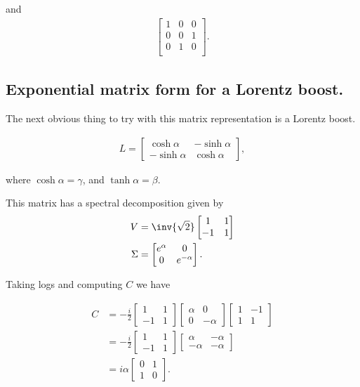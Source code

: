and
\begin{align*}
\begin{bmatrix}
1 & 0 & 0 \\
0 & 0 & 1 \\
0 & 1 & 0 \\
\end{bmatrix}.
\end{align*}

\subsection{Exponential matrix form for a Lorentz boost.}

The next obvious thing to try with this matrix representation is a Lorentz boost.

\begin{align}\label{eqn:rotationUnitary:40}
L =
\begin{bmatrix}
\cosh\alpha & -\sinh\alpha \\
-\sinh\alpha & \cosh\alpha
\end{bmatrix},
\end{align}

where $\cosh\alpha = \gamma$, and $\tanh\alpha = \beta$.

This matrix has a spectral decomposition given by
\begin{align}\label{eqn:rotationUnitary:41}
V &= \inv{\sqrt{2}}
\begin{bmatrix}
1 & 1 \\
-1 & 1
\end{bmatrix} \\
\Sigma &=
\begin{bmatrix}
e^\alpha & 0 \\
0 & e^{-\alpha}
\end{bmatrix}.
\end{align}

Taking logs and computing $C$ we have

\begin{align*}
C
&=
-\frac{i}{2}
\begin{bmatrix}
1 & 1 \\
-1 & 1
\end{bmatrix}
\begin{bmatrix}
\alpha & 0 \\
0 & -\alpha
\end{bmatrix}
\begin{bmatrix}
1 & -1 \\
1 & 1
\end{bmatrix} \\
&=
-\frac{i}{2}
\begin{bmatrix}
1 & 1 \\
-1 & 1
\end{bmatrix}
\begin{bmatrix}
\alpha & -\alpha \\
-\alpha & -\alpha
\end{bmatrix} \\
&=
i \alpha
\begin{bmatrix}
0 & 1 \\
1 & 0
\end{bmatrix}.
\end{align*}

